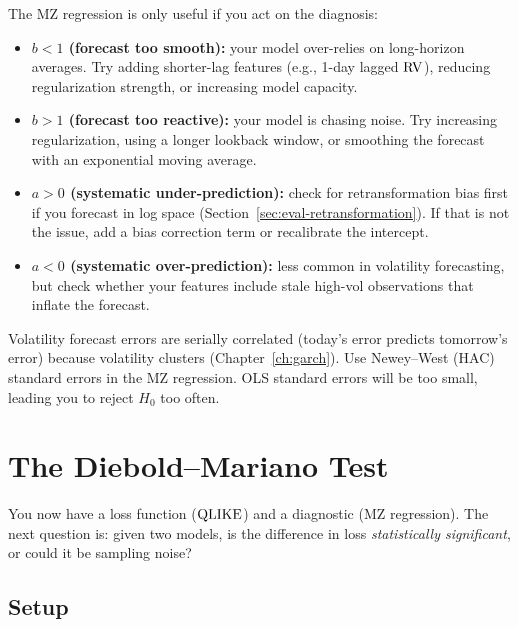 \begin{keyidea}
The MZ regression is only useful if you act on the diagnosis:
\begin{itemize}[nosep]
  \item \textbf{$b < 1$ (forecast too smooth):} your model over-relies on long-horizon averages. Try adding shorter-lag features (e.g., 1-day lagged $\operatorname{RV}$), reducing regularization strength, or increasing model capacity.
  \item \textbf{$b > 1$ (forecast too reactive):} your model is chasing noise. Try increasing regularization, using a longer lookback window, or smoothing the forecast with an exponential moving average.
  \item \textbf{$a > 0$ (systematic under-prediction):} check for retransformation bias first if you forecast in log space (Section~\ref{sec:eval-retransformation}). If that is not the issue, add a bias correction term or recalibrate the intercept.
  \item \textbf{$a < 0$ (systematic over-prediction):} less common in volatility forecasting, but check whether your features include stale high-vol observations that inflate the forecast.
\end{itemize}
\end{keyidea}

\begin{warning}
Volatility forecast errors are serially correlated (today's error predicts tomorrow's error) because volatility clusters (Chapter~\ref{ch:garch}).
Use Newey--West (HAC) standard errors in the MZ regression.
OLS standard errors will be too small, leading you to reject $H_0$ too often.
\end{warning}


\section{The Diebold--Mariano Test}
\label{sec:eval-dm}

You now have a loss function ($\operatorname{QLIKE}$) and a diagnostic (MZ regression).
The next question is: given two models, is the difference in loss \emph{statistically significant}, or could it be sampling noise?

\subsection{Setup}

